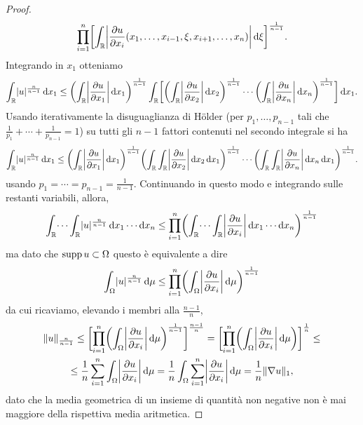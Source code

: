 \begin{proof}
\begin{equation}
        \prod_{i=1}^n\biggl[\int_\R\abs[\bigg]{\drp{u}{x_i}(x_1,\dotsc,x_{i-1},\xi,x_{i+1},\dotsc,x_n)}\,\dd\xi\biggr]^\frac1{n-1}.
    \end{equation}
    Integrando in $x_1$ otteniamo
    \begin{equation}
        \int_\R\abs{u}^\frac{n}{n-1}\,\dd x_1\le
        \biggl(\int_\R\abs[\bigg]{\drp{u}{x_1}}\,\dd x_1\biggr)^\frac1{n-1}
        \int_\R\biggl[
            \biggl(\int_\R\abs[\bigg]{\drp{u}{x_2}}\,\dd x_2\biggr)^\frac1{n-1}
            \dotsm
            \biggl(\int_\R\abs[\bigg]{\drp{u}{x_n}}\,\dd x_n\biggr)^\frac1{n-1}
        \biggr]\,\dd x_1.
    \end{equation}
    Usando iterativamente la disuguaglianza di Hölder (per $p_1,\dotsc,p_{n-1}$ tali che $\frac1{p_1}+\dotsb+\frac1{p_{n-1}}=1$) su tutti gli $n-1$ fattori contenuti nel secondo integrale si ha
    \begin{equation}
        \int_\R\abs{u}^\frac{n}{n-1}\,\dd x_1\le
        \biggl(\int_\R\abs[\bigg]{\drp{u}{x_1}}\,\dd x_1\biggr)^\frac1{n-1}
        \biggl(\int_\R\int_\R\abs[\bigg]{\drp{u}{x_2}}\,\dd x_2\,\dd x_1\biggr)^\frac1{n-1}
        \dotsm
        \biggl(\int_\R\int_\R\abs[\bigg]{\drp{u}{x_n}}\,\dd x_n\,\dd x_1\biggr)^\frac1{n-1}.
    \end{equation}
    usando $p_1=\dotsb=p_{n-1}=\frac1{n-1}$.
    Continuando in questo modo e integrando sulle restanti variabili, allora,
    \begin{equation}
        \int_\R\dotsi\int_\R\abs{u}^\frac{n}{n-1}\,\dd x_1\dotsm\dd x_n\le
        \prod_{i=1}^n\biggl(\int_\R\dotsi\int_\R\abs[\bigg]{\drp{u}{x_i}}\,\dd x_1\dotsm\dd x_n\biggr)^\frac1{n-1}
    \end{equation}
    ma dato che $\supp u\subset\Omega$ questo è equivalente a dire
    \begin{equation}
        \int_\Omega\abs{u}^\frac{n}{n-1}\,\dd\mu\le
        \prod_{i=1}^n\biggl(\int_\Omega\abs[\bigg]{\drp{u}{x_i}}\,\dd\mu\biggr)^\frac1{n-1}
    \end{equation}
    da cui ricaviamo, elevando i membri alla $\frac{n-1}{n}$,
    \begin{multline}
        \norm{u}_\frac{n}{n-1}\le
        \biggl[\prod_{i=1}^n\biggl(\int_\Omega\abs[\bigg]{\drp{u}{x_i}}\,\dd\mu\biggr)^\frac1{n-1}\biggr]^\frac{n-1}{n}=
        \biggl[\prod_{i=1}^n\biggl(\int_\Omega\abs[\bigg]{\drp{u}{x_i}}\,\dd\mu\biggr)\biggr]^\frac1{n}\le\\ \le
        \frac1{n}\sum_{i=1}^n\int_\Omega\abs[\bigg]{\drp{u}{x_i}}\,\dd\mu=
        \frac1{n}\int_\Omega\sum_{i=1}^n\abs[\bigg]{\drp{u}{x_i}}\,\dd\mu=
        \frac1{n}\norm{\grad u}_1,
    \end{multline}
    dato che la media geometrica di un insieme di quantità non negative non è mai maggiore della rispettiva media aritmetica.


\end{proof}
